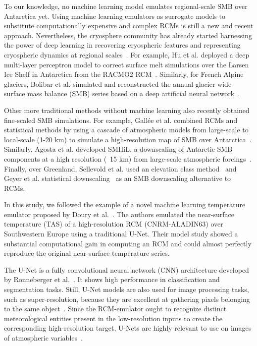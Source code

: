 \documentclass[a4paper,11pt,oneside]{report}
\begin{document}
To our knowledge, no machine learning model emulates regional-scale SMB over Antarctica yet. Using machine learning emulators as surrogate models to substitute computationally expensive and complex RCMs is still a new and recent approach. Nevertheless, the cryosphere community has already started harnessing the power of deep learning in recovering cryospheric features and representing cryospheric dynamics at regional scales~\cite{Liu2021}. For example, Hu et al. deployed a deep multi-layer perceptron model to correct surface melt simulations over the Larsen Ice Shelf in Antarctica from the RACMO2 RCM~\cite{Hu2021}. Similarly, for French Alpine glaciers, Bolibar et al. simulated and reconstructed the annual glacier-wide surface mass balance (SMB) series based on a deep artificial neural network~\cite{Bolibar2020}. 
    
Other more traditional methods without machine learning also recently obtained fine-scaled SMB simulations. For example, Gallée et al. combined RCMs and statistical methods by using a cascade of atmospheric models from large-scale to local-scale (1-20 \si{km}) to simulate a high-resolution map of SMB over Antarctica~\cite{Gallée2011}. Similarly, Agosta et al. developed SMHiL, a downscaling of Antarctic SMB components at a high resolution (~15 km) from large-scale atmospheric forcings~\cite{Agosta2012}. Finally, over Greenland, Sellevold et al. used an elevation class method~\cite{Sellevold2019} and Geyer et al. statistical downscaling~\cite{Geyer2013} as an SMB downscaling alternative to RCMs.
    
In this study, we followed the example of a novel machine learning temperature emulator proposed by Doury et al.~\cite{Doury}. The authors emulated the near-surface temperature (TAS) of a high-resolution RCM (CNRM-ALADIN63) over Southwestern Europe using a traditional U-Net. Their model study showed a substantial computational gain in computing an RCM and could almost perfectly reproduce the original near-surface temperature series. 
        
        
The U-Net is a fully convolutional neural network (CNN) architecture developed by Ronneberger et al.~\cite{Ronneberger2015}. It shows high performance in classification and segmentation tasks. Still, U-Net models are also used for image processing tasks, such as super-resolution, because they are excellent at gathering pixels belonging to the same object~\cite{Doury, howard2018fastai}. Since the RCM-emulator ought to recognize distinct meteorological entities present in the low-resolution inputs to create the corresponding high-resolution target, U-Nets are highly relevant to use on images of atmospheric variables~\cite{Doury}. 
\end{document}
